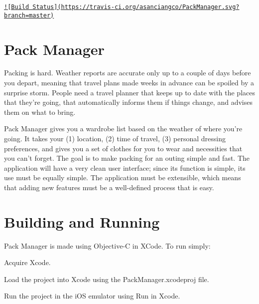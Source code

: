 \href{https://travis-ci.org/asanciangco/PackManager}{\tt !\mbox{[}Build Status\mbox{]}(https\-://travis-\/ci.\-org/asanciangco/\-Pack\-Manager.\-svg?branch=master)}

\section*{Pack Manager}

Packing is hard. Weather reports are accurate only up to a couple of days before you depart, meaning that travel plans made weeks in advance can be spoiled by a surprise storm. People need a travel planner that keeps up to date with the places that they're going, that automatically informs them if things change, and advises them on what to bring.

Pack Manager gives you a wardrobe list based on the weather of where you're going. It takes your (1) location, (2) time of travel, (3) personal dressing preferences, and gives you a set of clothes for you to wear and necessities that you can't forget. The goal is to make packing for an outing simple and fast. The application will have a very clean user interface; since its function is simple, its use must be equally simple. The application must be extensible, which means that adding new features must be a well-\/defined process that is easy.

\section*{Building and Running}

Pack Manager is made using Objective-\/\-C in X\-Code. To run simply\-:


\begin{DoxyItemize}
\item Acquire Xcode.
\item Load the project into Xcode using the {\ttfamily Pack\-Manager.\-xcodeproj} file.
\item Run the project in the i\-O\-S emulator using {\ttfamily Run} in Xcode. 
\end{DoxyItemize}